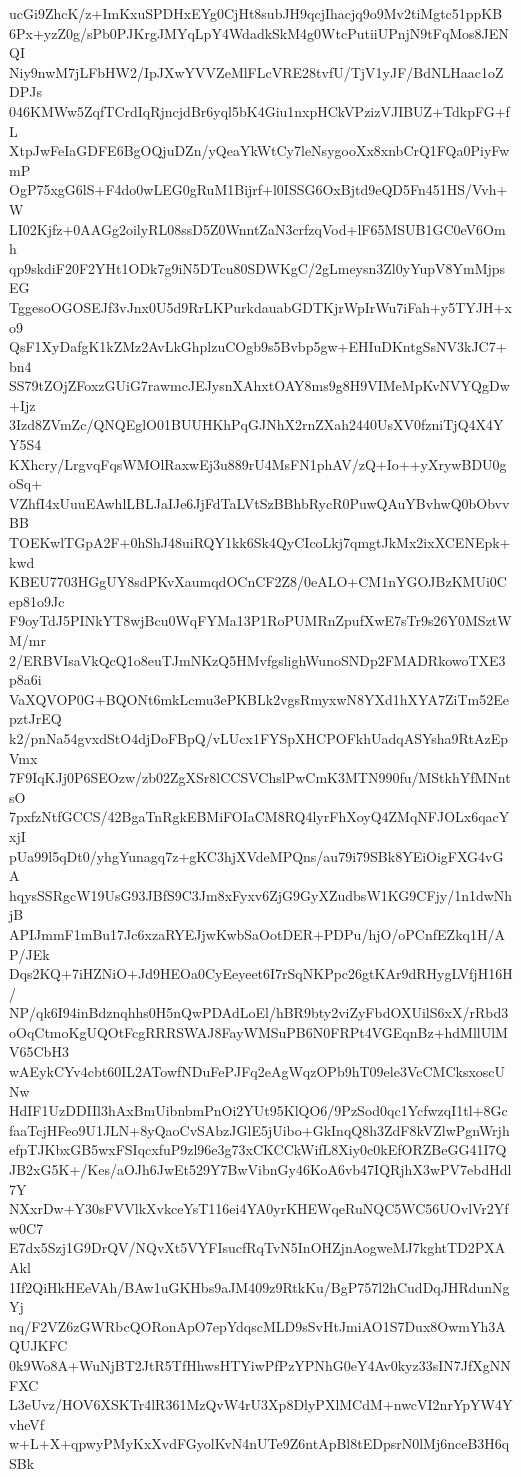 ucGi9ZhcK/z+ImKxuSPDHxEYg0CjHt8subJH9qcjIhacjq9o9Mv2tiMgtc51ppKB
6Px+yzZ0g/sPb0PJKrgJMYqLpY4WdadkSkM4g0WtcPutiiUPnjN9tFqMos8JENQI
Niy9nwM7jLFbHW2/IpJXwYVVZeMlFLcVRE28tvfU/TjV1yJF/BdNLHaac1oZDPJs
046KMWw5ZqfTCrdIqRjncjdBr6yql5bK4Giu1nxpHCkVPzizVJIBUZ+TdkpFG+fL
XtpJwFeIaGDFE6BgOQjuDZn/yQeaYkWtCy7leNsygooXx8xnbCrQ1FQa0PiyFwmP
OgP75xgG6lS+F4do0wLEG0gRuM1Bijrf+l0ISSG6OxBjtd9eQD5Fn451HS/Vvh+W
LI02Kjfz+0AAGg2oilyRL08ssD5Z0WnntZaN3crfzqVod+lF65MSUB1GC0eV6Omh
qp9skdiF20F2YHt1ODk7g9iN5DTcu80SDWKgC/2gLmeysn3Zl0yYupV8YmMjpsEG
TggesoOGOSEJf3vJnx0U5d9RrLKPurkdauabGDTKjrWpIrWu7iFah+y5TYJH+xo9
QsF1XyDafgK1kZMz2AvLkGhplzuCOgb9s5Bvbp5gw+EHIuDKntgSsNV3kJC7+bn4
SS79tZOjZFoxzGUiG7rawmcJEJysnXAhxtOAY8ms9g8H9VIMeMpKvNVYQgDw+Ijz
3Izd8ZVmZc/QNQEglO01BUUHKhPqGJNhX2rnZXah2440UsXV0fzniTjQ4X4YY5S4
KXhcry/LrgvqFqsWMOlRaxwEj3u889rU4MsFN1phAV/zQ+Io++yXrywBDU0goSq+
VZhfI4xUuuEAwhlLBLJaIJe6JjFdTaLVtSzBBhbRycR0PuwQAuYBvhwQ0bObvvBB
TOEKwlTGpA2F+0hShJ48uiRQY1kk6Sk4QyCIcoLkj7qmgtJkMx2ixXCENEpk+kwd
KBEU7703HGgUY8sdPKvXaumqdOCnCF2Z8/0eALO+CM1nYGOJBzKMUi0Cep81o9Jc
F9oyTdJ5PINkYT8wjBcu0WqFYMa13P1RoPUMRnZpufXwE7sTr9s26Y0MSztWM/mr
2/ERBVIsaVkQcQ1o8euTJmNKzQ5HMvfgslighWunoSNDp2FMADRkowoTXE3p8a6i
VaXQVOP0G+BQONt6mkLcmu3ePKBLk2vgsRmyxwN8YXd1hXYA7ZiTm52EepztJrEQ
k2/pnNa54gvxdStO4djDoFBpQ/vLUcx1FYSpXHCPOFkhUadqASYsha9RtAzEpVmx
7F9IqKJj0P6SEOzw/zb02ZgXSr8lCCSVChslPwCmK3MTN990fu/MStkhYfMNntsO
7pxfzNtfGCCS/42BgaTnRgkEBMiFOIaCM8RQ4lyrFhXoyQ4ZMqNFJOLx6qacYxjI
pUa99l5qDt0/yhgYunagq7z+gKC3hjXVdeMPQns/au79i79SBk8YEiOigFXG4vGA
hqysSSRgcW19UsG93JBfS9C3Jm8xFyxv6ZjG9GyXZudbsW1KG9CFjy/1n1dwNhjB
APIJmmF1mBu17Jc6xzaRYEJjwKwbSaOotDER+PDPu/hjO/oPCnfEZkq1H/AP/JEk
Dqs2KQ+7iHZNiO+Jd9HEOa0CyEeyeet6I7rSqNKPpc26gtKAr9dRHygLVfjH16H/
NP/qk6I94inBdznqhhs0H5nQwPDAdLoEl/hBR9bty2viZyFbdOXUilS6xX/rRbd3
oOqCtmoKgUQOtFcgRRRSWAJ8FayWMSuPB6N0FRPt4VGEqnBz+hdMllUlMV65CbH3
wAEykCYv4cbt60IL2ATowfNDuFePJFq2eAgWqzOPb9hT09ele3VcCMCksxoscUNw
HdIF1UzDDIIl3hAxBmUibnbmPnOi2YUt95KlQO6/9PzSod0qc1YcfwzqI1tl+8Gc
faaTcjHFeo9U1JLN+8yQaoCvSAbzJGlE5jUibo+GkInqQ8h3ZdF8kVZlwPgnWrjh
efpTJKbxGB5wxFSIqcxfuP9zl96e3g73xCKCCkWifL8Xiy0c0kEfORZBeGG41I7Q
JB2xG5K+/Kes/aOJh6JwEt529Y7BwVibnGy46KoA6vb47IQRjhX3wPV7ebdHdl7Y
NXxrDw+Y30sFVVlkXvkceYsT116ei4YA0yrKHEWqeRuNQC5WC56UOvlVr2Yfw0C7
E7dx5Szj1G9DrQV/NQvXt5VYFIsucfRqTvN5InOHZjnAogweMJ7kghtTD2PXAAkl
1If2QiHkHEeVAh/BAw1uGKHbs9aJM409z9RtkKu/BgP757l2hCudDqJHRdunNgYj
nq/F2VZ6zGWRbcQORonApO7epYdqscMLD9sSvHtJmiAO1S7Dux8OwmYh3AQUJKFC
0k9Wo8A+WuNjBT2JtR5TfHhwsHTYiwPfPzYPNhG0eY4Av0kyz33sIN7JfXgNNFXC
L3eUvz/HOV6XSKTr4lR361MzQvW4rU3Xp8DlyPXlMCdM+nwcVI2nrYpYW4YvheVf
w+L+X+qpwyPMyKxXvdFGyolKvN4nUTe9Z6ntApBl8tEDpsrN0lMj6nceB3H6qSBk
